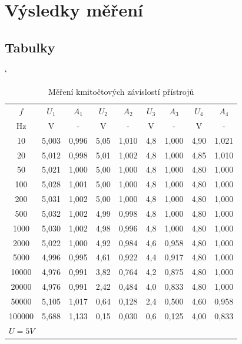 \documentclass[a4paper, czech]{article}
\begin{document}
\section{Výsledky měření}

\subsection{Tabulky}

\begin{table}[H]
    \catcode`
    \centering
    \caption{Měření kmitočtových závislostí přístrojů}
    \begin{tabular}{ccccccccc}
        \toprule
        $f$      & $U_1$    & $A_1$    & $U_2$   & $A_2$    & $U_3$  & $A_3$    & $U_4$   & $A_4$    \\
        \cmidrule(rl){1-1}
        \cmidrule(rl){2-3}
        \cmidrule(rl){4-5}
        \cmidrule(rl){6-7}
        \cmidrule(rl){8-9}
        Hz     & V     & -     & V    & -     & V   & -     & V    & -     \\
        \midrule
        10     & 5,003 & 0,996 & 5,05 & 1,010 & 4,8 & 1,000 & 4,90 & 1,021 \\
        20     & 5,012 & 0,998 & 5,01 & 1,002 & 4,8 & 1,000 & 4,85 & 1,010 \\
        50     & 5,021 & 1,000 & 5,00 & 1,000 & 4,8 & 1,000 & 4,80 & 1,000 \\
        100    & 5,028 & 1,001 & 5,00 & 1,000 & 4,8 & 1,000 & 4,80 & 1,000 \\
        200    & 5,031 & 1,002 & 5,00 & 1,000 & 4,8 & 1,000 & 4,80 & 1,000 \\
        500    & 5,032 & 1,002 & 4,99 & 0,998 & 4,8 & 1,000 & 4,80 & 1,000 \\
        1000   & 5,030 & 1,002 & 4,98 & 0,996 & 4,8 & 1,000 & 4,80 & 1,000 \\
        2000   & 5,022 & 1,000 & 4,92 & 0,984 & 4,6 & 0,958 & 4,80 & 1,000 \\
        5000   & 4,996 & 0,995 & 4,61 & 0,922 & 4,4 & 0,917 & 4,80 & 1,000 \\
        10000  & 4,976 & 0,991 & 3,82 & 0,764 & 4,2 & 0,875 & 4,80 & 1,000 \\
        20000  & 4,976 & 0,991 & 2,42 & 0,484 & 4,0 & 0,833 & 4,80 & 1,000 \\
        50000  & 5,105 & 1,017 & 0,64 & 0,128 & 2,4 & 0,500 & 4,60 & 0,958 \\
        100000 & 5,688 & 1,133 & 0,15 & 0,030 & 0,6 & 0,125 & 4,00 & 0,833 \\
        \bottomrule
        \multicolumn{9}{l}{$U = 5V$}
    \end{tabular}
\end{table}
\end{document}
